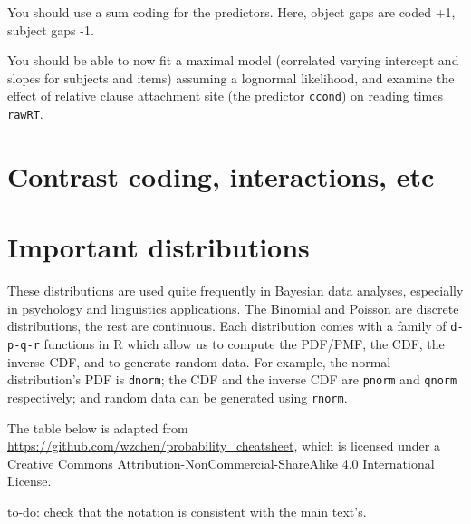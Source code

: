 \documentclass[12pt,]{krantz}
\newenvironment{Shaded}{\begin{snugshade}}{\end{snugshade}}
\newcommand{\DataTypeTok}[1]{\textcolor[rgb]{0.13,0.29,0.53}{#1}}
\newcommand{\DecValTok}[1]{\textcolor[rgb]{0.00,0.00,0.81}{#1}}
\newcommand{\KeywordTok}[1]{\textcolor[rgb]{0.13,0.29,0.53}{\textbf{#1}}}
\newcommand{\NormalTok}[1]{#1}
\newcommand{\OperatorTok}[1]{\textcolor[rgb]{0.81,0.36,0.00}{\textbf{#1}}}
\newcommand{\StringTok}[1]{\textcolor[rgb]{0.31,0.60,0.02}{#1}}
\theoremstyle{definition}
\theoremstyle{definition}
\theoremstyle{definition}
\theoremstyle{remark}
\begin{document}
You should use a sum coding for the predictors. Here, object gaps are coded +1, subject gaps -1.

\begin{Shaded}
\end{Shaded}

You should be able to now fit a maximal model (correlated varying intercept and slopes for subjects and items) assuming a lognormal likelihood, and examine the effect of relative clause attachment site (the predictor \texttt{ccond}) on reading times \texttt{rawRT}.

\hypertarget{contrast-coding-interactions-etc}{%
\chapter{Contrast coding, interactions, etc}\label{contrast-coding-interactions-etc}}

\hypertarget{important-distributions}{%
\chapter{Important distributions}\label{important-distributions}}

These distributions are used quite frequently in Bayesian data analyses, especially in psychology and linguistics applications. The Binomial and Poisson are discrete distributions, the rest are continuous. Each distribution comes with a family of \texttt{d-p-q-r} functions in R which allow us to compute the PDF/PMF, the CDF, the inverse CDF, and to generate random data. For example, the normal distribution's PDF is \texttt{dnorm}; the CDF and the inverse CDF are \texttt{pnorm} and \texttt{qnorm} respectively; and random data can be generated using \texttt{rnorm}.

The table below is adapted from \url{https://github.com/wzchen/probability_cheatsheet}, which is licensed under a Creative Commons Attribution-NonCommercial-ShareAlike 4.0 International License.

to-do: check that the notation is consistent with the main text's.
\end{document}
